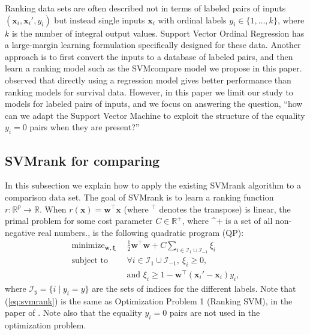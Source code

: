 \documentclass[twoside,11pt]{article}
\newcommand{\changed}[1]{
  #1
}
\newcommand{\RR}{\mathbb R}
\DeclareMathOperator*{\minimize}{minimize}
\begin{document}
\changed{Ranking data sets are often described not in terms of labeled
  pairs of inputs $(\mathbf x_i, \mathbf x_i', y_i)$ but instead
  single inputs $\mathbf x_i$ with ordinal labels
  $y_i\in\{1,\dots,k\}$, where $k$ is the number of integral output
  values. Support Vector Ordinal Regression \citep{ordinal} has a
  large-margin learning formulation specifically designed for these
  data. Another approach is to first convert the inputs to a database
  of labeled pairs, and then learn a ranking model such as the
  SVMcompare model we propose in this paper. \citet{sv-survival}
  observed that directly using a regression model gives better
  performance than ranking models for survival data. However, in this
  paper we limit our study to models for labeled pairs of inputs, and
  we focus on answering the question, ``how can we adapt the Support
  Vector Machine to exploit the structure of the equality $y_i=0$
  pairs when they are present?''}


\subsection{SVMrank for comparing}
\label{sec:svmrank}
In this subsection we explain how to apply the existing SVMrank algorithm
to a comparison data set.  The goal of SVMrank is to learn a ranking
function $r:\RR^p \rightarrow \RR$. When $r(\mathbf x)=\mathbf
w^\intercal \mathbf x$ (where $^\top$ denotes the transpose) is linear, the primal problem for some cost
parameter $C\in\RR^+$, where ^+ is a set of all non-negative real numbers., is the following quadratic program (QP):
\begin{equation}
  \begin{aligned}
    \minimize_{\mathbf w, \mathbf \xi}\ \ & \frac 1 2
    \mathbf w^\intercal \mathbf w
    + C \sum_{i\in \mathcal I_1\cup \mathcal I_{-1}} \xi_i \\
    \text{subject to}\ \ &
    \forall i\in \mathcal I_1\cup \mathcal I_{-1},\ \xi_i \geq 0,\\
    & \text{and }\xi_i \geq 1-\mathbf w^\intercal(\mathbf x_i'-\mathbf
    x_i)y_i,
  \end{aligned}
  \label{eq:svmrank}
\end{equation}
where $\mathcal I_y=\{i\mid y_i=y\}$ are the sets of indices for the different
labels. Note that (\ref{eq:svmrank}) is the same as Optimization
Problem 1 (Ranking SVM), in the paper of \citet{ranksvm}. Note also
that the equality $y_i=0$ pairs are not used in the optimization
problem.
\end{document}

